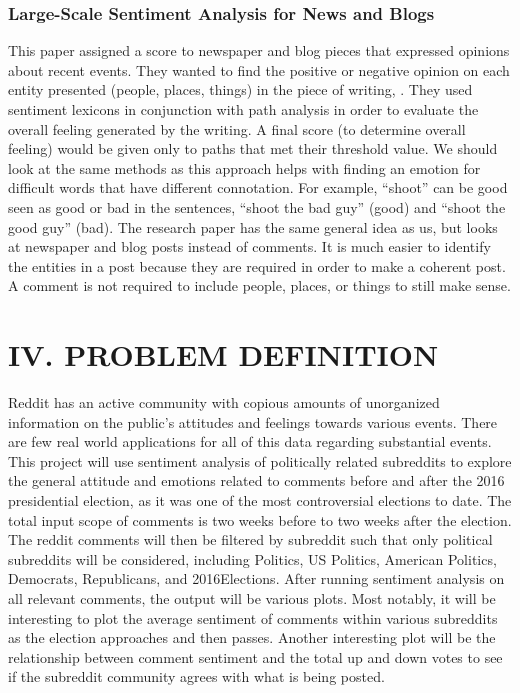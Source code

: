\documentclass[letterpaper]{article}
\begin{document}
\subsubsection{Large-Scale Sentiment Analysis for News and Blogs}

This paper assigned a score to newspaper and blog pieces that expressed opinions about recent events. They wanted to find the positive or negative opinion on each entity presented (people, places, things)  in the piece of writing, \cite{LargeScaleSentiment}. They used sentiment lexicons in conjunction with path analysis in order to evaluate the overall feeling generated by the writing. A final score (to determine overall feeling) would be given only to paths that met their threshold value.
We should look at the same methods as this approach helps with finding an emotion for difficult words that have different connotation. For example, “shoot” can be good seen as good or bad in the sentences, “shoot the bad guy” (good) and “shoot the good guy” (bad).
The research paper has the same general idea as us, but looks at newspaper and blog posts instead of comments. It is much easier to identify the entities in a post because they are required in order to make a coherent post. A comment is not required to include people, places, or things to still make sense.

\section{IV. PROBLEM DEFINITION}

Reddit has an active community with copious amounts of unorganized information on the public's attitudes and feelings towards various events. There are few real world applications for all of this data regarding substantial events. This project will use sentiment analysis of politically related subreddits to explore the general attitude and emotions related to comments before and after the 2016 presidential election, as it was one of the most controversial elections to date. The total input scope of comments is two weeks before to two weeks after the election. The reddit comments will then be filtered by subreddit such that only political subreddits will be considered, including Politics, US Politics, American Politics, Democrats, Republicans, and 2016Elections. After running sentiment analysis on all relevant comments, the output will be various plots. Most notably, it will be interesting to plot the average sentiment of comments within various subreddits as the election approaches and then passes. Another interesting plot will be the relationship between comment sentiment and the total up and down votes to see if the subreddit community agrees with what is being posted.
\end{document}
